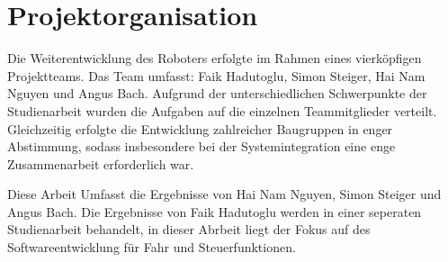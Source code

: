 %
%	
%	
%	
%	
%	
%	
%	



\section{Projektorganisation}

Die Weiterentwicklung des Roboters erfolgte im Rahmen eines vierköpfigen Projektteams. Das Team umfasst: Faik Hadutoglu, Simon Steiger, Hai Nam Nguyen und Angus Bach. Aufgrund der unterschiedlichen Schwerpunkte der Studienarbeit wurden die Aufgaben auf die einzelnen Teammitglieder verteilt. Gleichzeitig erfolgte die Entwicklung zahlreicher Baugruppen in enger Abstimmung, sodass insbesondere bei der Systemintegration eine enge Zusammenarbeit erforderlich war. 

Diese Arbeit Umfasst die Ergebnisse von Hai Nam Nguyen, Simon Steiger und Angus Bach. Die Ergebnisse von Faik Hadutoglu werden in einer seperaten Studienarbeit behandelt, in dieser Abrbeit liegt der Fokus auf des Softwareentwicklung für Fahr und Steuerfunktionen.

